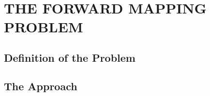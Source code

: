 \chapter{THE FORWARD MAPPING PROBLEM}
\thispagestyle{plain}

\label{ForwardMapping}


\section{Definition of the Problem}





\section{The \fw Approach}


